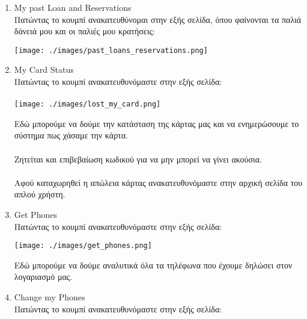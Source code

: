 \documentclass[14pt]{report}
\begin{document}
\begin{enumerate}[label=(\arabic*)]
 		\newpage
 		\hypertarget{s-past-loans}{}
 		\item My past Loan and Reservations \\
 		Πατώντας το κουμπί ανακατευθύνομαι στην εξής σελίδα, όπου φαίνονται τα παλιά δάνειά μου και οι παλιές μου κρατήσεις: \\
 		
 		\vspace{\baselineskip}
 		
 		\texttt{[image: ./images/past\_loans\_reservations.png]}
 		
 		\vspace{\baselineskip}
 		
 		\newpage
 		\hypertarget{s-card-status}{}
 		\item My Card Status  \\
 		Πατώντας το κουμπί ανακατευθυνόμαστε στην εξής σελίδα: \\ \\
 		\texttt{[image: ./images/lost\_my\_card.png]}
 		
 		\vspace{\baselineskip}
 		
 		Εδώ μπορούμε να δούμε την κατάσταση της κάρτας μας και να ενημερώσουμε το σύστημα πως χάσαμε την κάρτα. \\ \\
 		Ζητείται και επιβεβαίωση κωδικού για να μην μπορεί να γίνει ακούσια. \\ \\ 
 		Αφού καταχωρηθεί η απώλεια κάρτας ανακατευθυνόμαστε στην αρχική σελίδα του απλού χρήστη. \\
 		
 		\newpage
 		\hypertarget{s-get-phones}{}
 		\item Get Phones \\
 		Πατώντας το κουμπί ανακατευθυνόμαστε στην εξής σελίδα: \\
 		
 		\vspace{\baselineskip}
 		
 		\texttt{[image: ./images/get\_phones.png]}
 		
 		\vspace{\baselineskip}
 		
 		Εδώ μπορούμε να δούμε αναλυτικά όλα τα τηλέφωνα που έχουμε δηλώσει στον λογαριασμό μας.
 		
 		\newpage
 		\hypertarget{s-change-phones}{}
 		\item Change my Phones \\
 		Πατώντας το κουμπί ανακατευθυνόμαστε στην εξής σελίδα: \\
 		

\end{enumerate}
\end{document}
